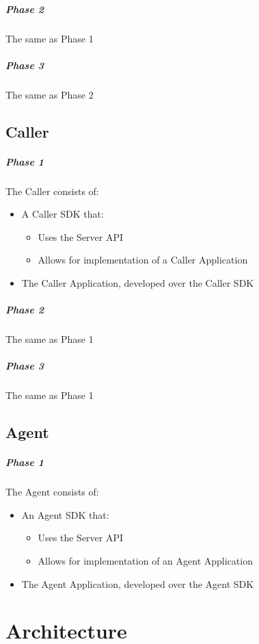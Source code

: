 \documentclass{article}
\begin{document}
	\subparagraph*{Phase 2}
	
	The same as Phase 1

	\subparagraph*{Phase 3}
	
	The same as Phase 2

	\subsection{Caller}
	
	\subparagraph*{Phase 1}
	
	The Caller consists of:
	\begin{itemize}
		\item A Caller SDK that:
		\begin{itemize}
			\item Uses the Server API
			\item Allows for implementation of a Caller Application
		\end{itemize}
		\item The Caller Application, developed over the Caller SDK
	\end{itemize}

	\subparagraph*{Phase 2}
	
	The same as Phase 1

	\subparagraph*{Phase 3}
	
	The same as Phase 1

	\subsection{Agent}
	
	\subparagraph*{Phase 1}
	
	The Agent consists of:
	\begin{itemize}
		\item An Agent SDK that:
		\begin{itemize}
			\item Uses the Server API
			\item Allows for implementation of an Agent Application
		\end{itemize}
		\item The Agent Application, developed over the Agent SDK
	\end{itemize}

	\newpage

	\section{Architecture}
	
\end{document}
